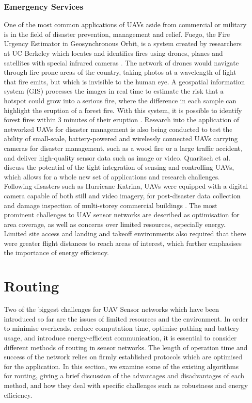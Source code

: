 \subsubsection{Emergency Services}
One of the most common applications of UAVs aside from commercial or military is in the field of disaster prevention, management and relief. Fuego, the Fire Urgency Estimator in Geosynchronous Orbit, is a system created by researchers at UC Berkeley which locates and identifies fires using drones, planes and satellites with special infrared cameras \cite{shelbycarpenter2015}. The network of drones would navigate through fire-prone areas of the country, taking photos at a wavelength of light that fire emits, but which is invisible to the human eye. A geospatial information system (GIS) processes the images in real time to estimate the risk that a hotspot could grow into a serious fire, where the difference in each sample can highlight the eruption of a forest fire. With this system, it is possible to identify forest fires within 3 minutes of their eruption \cite{fuego2015}.
Research into the application of networked UAVs for disaster management is also being conducted to test the ability of small-scale, battery-powered and wirelessly connected UAVs carrying cameras for disaster management, such as a wood fire or a large traffic accident, and deliver high-quality sensor data such as image or video. Quaritsch et al. \cite{quaritsch2010} discuss the potential of the tight integration of sensing and controlling UAVs, which allows for a whole new set of applications and research challenges. Following disasters such as Hurricane Katrina, UAVs were equipped with a digital camera capable of both still and video imagery, for post-disaster data collection and damage inspection of multi-storey commercial buildings \cite{stuartadams2011}. The most prominent challenges to UAV sensor networks are described as optimisation for area coverage, as well as concerns over limited resources, especially energy. Limited site access and landing and takeoff environments also required that there were greater flight distances to reach areas of interest, which further emphasises the importance of energy efficiency. 

\section{Routing}
Two of the biggest challenges for UAV Sensor networks which have been introduced so far are the issues of limited resources and the environment. In order to minimise overheads, reduce computation time, optimise pathing and battery usage, and introduce energy-efficient communication, it is essential to consider different methods of routing in sensor networks. The length of operation time and success of the network relies on firmly established protocols which are optimised for the application. In this section, we examine some of the existing algorithms for routing, giving a brief discussion of the advantages and disadvantages of each method, and how they deal with specific challenges such as robustness and energy efficiency. 

